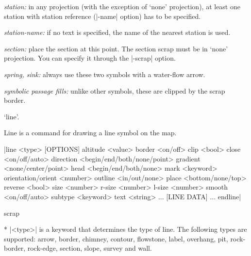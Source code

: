       {\it station:} in any projection (with the exception of `none' projection),
      at least one station with station reference (|-name| option) has 
      to be specified.
        
      {\it station-name:} if no text is specified, the name of the nearest
      station is used.
        
      {\it section:} place the section at this point. The section scrap
      must be in `none' projection. You can specify it through the |-scrap|
      option.
        
      {\it spring, sink:} always use these two symbols with a water-flow
      arrow.
        
      {\it symbolic passage fills:} unlike other symbols, these are
      clipped by the scrap border.
  \endlist
\endnotes


\subsubchapter `line'.

\description
Line is a command for drawing a line symbol on the map.
\enddescription

\syntax
  |line <type> [OPTIONS]
         altitude <value>
         border <on/off>
         clip <bool>
         close <on/off/auto>
         direction <begin/end/both/none/point>
         gradient <none/center/point>
         head <begin/end/both/none>
         mark <keyword>
         orientation/orient <number>
         outline <in/out/none>
         place <bottom/none/top>
         reverse <bool>
         size <number>
         r-size <number>
         l-size <number>
         smooth <on/off/auto>
         subtype <keyword>
         text <string>
         ...
         [LINE DATA]
         ...
       endline|
\endsyntax

\context
  scrap
\endcontext

\arguments
   * |<type>| is a keyword that determines the type of line.
     The following types are supported: arrow, border, chimney,
     contour, flowstone, label, overhang, pit, rock-border,
     rock-edge, section, slope, survey and wall.
\endarguments


